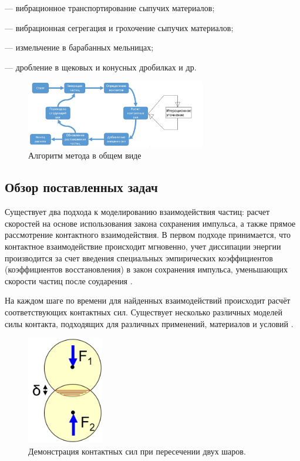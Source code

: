 \documentclass[utf8x, 14pt, oneside, a4paper]{article}
\begin{document}
--- вибрационное транспортирование сыпучих материалов;

--- вибрационная сегрегация и грохочение сыпучих материалов;

--- измельчение в барабанных мельницах;

--- дробление в щековых и конусных дробилках и др.

\begin{figure}[H]
	\centering
	\includegraphics[width=0.7\textwidth]{algorithm}
	\caption{Алгоритм метода в общем виде}
	\label{pic:algo}
\end{figure} 

\subsection*{Обзор поставленных задач}

Существует два подхода к моделированию взаимодействия частиц: расчет скоростей на основе использования закона сохранения импульса, а также прямое рассмотрение контактного взаимодействия. В первом подходе принимается, что контактное взаимодействие происходит мгновенно, учет диссипации энергии производится за счет введения специальных эмпирических коэффициентов (коэффициентов восстановления) в закон сохранения импульса, уменьшающих скорости частиц после соударения \cite{cundall}.

На каждом шаге по времени для найденных взаимодействий происходит расчёт соответствующих контактных сил.
Существует несколько различных моделей силы контакта, подходящих для различных применений, материалов и условий \cite{hard_aglomerath}.

\begin{figure}[H]
	\centering
	\includegraphics[width=0.3\textwidth]{vhod}
	\caption{Демонстрация контактных сил при пересечении двух шаров.}
\end{figure} 
\end{document}
